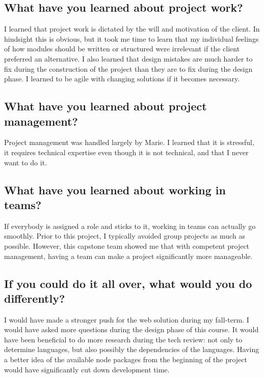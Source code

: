 \documentclass[onecolumn, draftclsnofoot,10pt, compsoc]{report}
\begin{document}
\subsection{What have you learned about project work?}
I learned that project work is dictated by the will and motivation of the client. In hindsight this is obvious, but it took me time to learn that my individual feelings of how modules should be written or structured were irrelevant if the client preferred an alternative. I also learned that design mistakes are much harder to fix during the construction of the project than they are to fix during the design phase. I learned to be agile with changing solutions if it becomes necessary.
\subsection{What have you learned about project management?}
Project management was handled largely by Marie. I learned that it is stressful, it requires technical expertise even though it is not technical, and that I never want to do it.
\subsection{What have you learned about working in teams?}
If everybody is assigned a role and sticks to it, working in teams can actually go smoothly. Prior to this project, I typically avoided group projects as much as possible. However, this capstone team showed me that with competent project management, having a team can make a project significantly more manageable.
\subsection{If you could do it all over, what would you do differently?}
I would have made a stronger push for the web solution during my fall-term. I would have asked more questions during the design phase of this course. It would have been beneficial to  do more research during the tech review: not only  to determine languages, but also possibly the dependencies of the languages. Having a better idea of the available node packages from the beginning of the project would have significantly cut down development time.

\appendix
\end{document}

